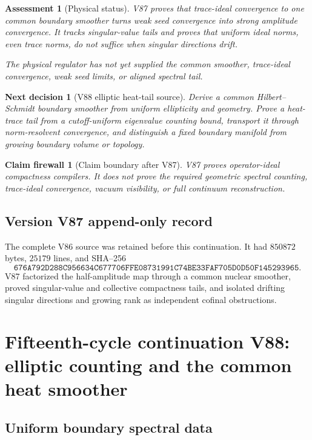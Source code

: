 \documentclass[11pt]{article}
\newtheorem{firewall}[theorem]{Claim firewall}
\newtheorem{decision}[theorem]{Next decision}
\newtheorem{assessment}[theorem]{Assessment}
\theoremstyle{remark}
\begin{document}
\begin{assessment}[Physical status]
\label{ass:v15v87-status}
V87 proves that trace-ideal convergence to one common boundary
smoother turns weak seed convergence into strong amplitude
convergence.  It tracks singular-value tails and proves that
uniform ideal norms, even trace norms, do not suffice when singular
directions drift.

The physical regulator has not yet supplied the common smoother,
trace-ideal convergence, weak seed limits, or aligned spectral tail.
\end{assessment}

\begin{decision}[V88 elliptic heat-tail source]
\label{dec:v15v87-next}
Derive a common Hilbert--Schmidt boundary smoother from uniform
ellipticity and geometry.  Prove a heat-trace tail from a
cutoff-uniform eigenvalue counting bound, transport it through
norm-resolvent convergence, and distinguish a fixed boundary
manifold from growing boundary volume or topology.
\end{decision}

\begin{firewall}[Claim boundary after V87]
\label{fire:v15v87}
V87 proves operator-ideal compactness compilers.  It does not prove
the required geometric spectral counting, trace-ideal convergence,
vacuum visibility, or full continuum reconstruction.
\end{firewall}

\section*{Version V87 append-only record}
The complete V86 source was retained before this continuation.  It
had \(850872\) bytes, \(25179\) lines, and SHA--256
\[
 \texttt{676A792D288C956634C677706FFE08731991C74BE33FAF705D0D50F145293965}.
\]
V87 factorized the half-amplitude map through a common nuclear
smoother, proved singular-value and collective compactness tails,
and isolated drifting singular directions and growing rank as
independent cofinal obstructions.

\chapter{Fifteenth-cycle continuation V88: elliptic counting and the common heat smoother}
\label{sec:v15v88}

\section{Uniform boundary spectral data}
\end{document}
